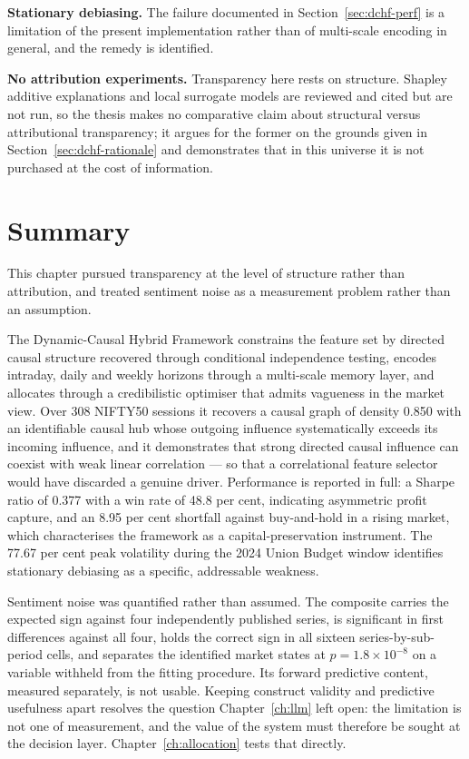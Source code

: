 \textbf{Stationary debiasing.} The failure documented in Section~\ref{sec:dchf-perf} is a
limitation of the present implementation rather than of multi-scale encoding in general, and the
remedy is identified.

\textbf{No attribution experiments.} Transparency here rests on structure. Shapley additive
explanations and local surrogate models are reviewed and cited but are not run, so the thesis makes
no comparative claim about structural versus attributional transparency; it argues for the former
on the grounds given in Section~\ref{sec:dchf-rationale} and demonstrates that in this universe it
is not purchased at the cost of information.

\section{Summary}

This chapter pursued transparency at the level of structure rather than attribution, and treated
sentiment noise as a measurement problem rather than an assumption.

The Dynamic-Causal Hybrid Framework constrains the feature set by directed causal structure
recovered through conditional independence testing, encodes intraday, daily and weekly horizons
through a multi-scale memory layer, and allocates through a credibilistic optimiser that admits
vagueness in the market view. Over 308 NIFTY50 sessions it recovers a causal graph of density
0.850 with an identifiable causal hub whose outgoing influence systematically exceeds its
incoming influence, and it demonstrates that strong directed causal influence can coexist with
weak linear correlation --- so that a correlational feature selector would have discarded a
genuine driver. Performance is reported in full: a Sharpe ratio of 0.377 with a win rate of 48.8
per cent, indicating asymmetric profit capture, and an 8.95 per cent shortfall against
buy-and-hold in a rising market, which characterises the framework as a capital-preservation
instrument. The 77.67 per cent peak volatility during the 2024 Union Budget window identifies
stationary debiasing as a specific, addressable weakness.

Sentiment noise was quantified rather than assumed. The composite carries the expected sign
against four independently published series, is significant in first differences against all
four, holds the correct sign in all sixteen series-by-sub-period cells, and separates the
identified market states at $p = 1.8 \times 10^{-8}$ on a variable withheld from the fitting
procedure. Its forward predictive content, measured separately, is not usable. Keeping construct
validity and predictive usefulness apart resolves the question Chapter~\ref{ch:llm} left open: the
limitation is not one of measurement, and the value of the system must therefore be sought at the
decision layer. Chapter~\ref{ch:allocation} tests that directly.

